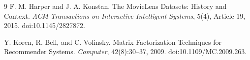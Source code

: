 \documentclass[UTF8,zihao=-4,scheme=plain]{ctexart}
\begin{document}
\begin{thebibliography}{9}
F. M. Harper and J. A. Konstan.
\newblock The MovieLens Datasets: History and Context.
\newblock \emph{ACM Transactions on Interactive Intelligent Systems}, 5(4), Article 19, 2015.
\newblock doi:10.1145/2827872.

Y. Koren, R. Bell, and C. Volinsky.
\newblock Matrix Factorization Techniques for Recommender Systems.
\newblock \emph{Computer}, 42(8):30--37, 2009.
\newblock doi:10.1109/MC.2009.263.

\end{thebibliography}
\end{document}
